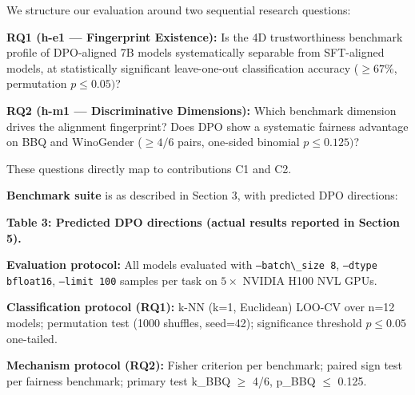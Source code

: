 
We structure our evaluation around two sequential research questions:

\textbf{RQ1 (h-e1 --- Fingerprint Existence):} Is the 4D trustworthiness benchmark profile
of DPO-aligned 7B models systematically separable from SFT-aligned models, at
statistically significant leave-one-out classification accuracy ($\geq 67$\%, permutation $p\leq 0.05)$?

\textbf{RQ2 (h-m1 --- Discriminative Dimensions):} Which benchmark dimension drives the
alignment fingerprint? Does DPO show a systematic fairness advantage on BBQ and WinoGender
($\geq 4/6$ pairs, one-sided binomial $p\leq 0.125)$?

These questions directly map to contributions C1 and C2.

\textbf{Benchmark suite} is as described in Section 3, with predicted DPO directions:

\begin{table}[htbp]
\centering
{}
\end{table}

\textbf{Table 3: Predicted DPO directions (actual results reported in Section 5).}

\textbf{Evaluation protocol:} All models evaluated with \texttt{--batch\textbackslash \_size 8}, \texttt{--dtype bfloat16},
\texttt{--limit 100} samples per task on $5\times$ NVIDIA H100 NVL GPUs.

\textbf{Classification protocol (RQ1):} k-NN (k=1, Euclidean) LOO-CV over n=12 models;
permutation test (1000 shuffles, seed=42); significance threshold $p\leq 0.05$ one-tailed.

\textbf{Mechanism protocol (RQ2):} Fisher criterion per benchmark; paired sign test per
fairness benchmark; primary test k\_BBQ $\geq$ 4/6, p\_BBQ $\leq$ 0.125.

